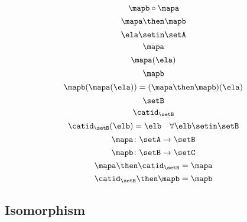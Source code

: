 \begin{forslides}
\begin{equation}
\mapb \circ \mapa
\end{equation}
\begin{equation}\label{eq:slides_session2_135}
\mapa \then \mapb
\end{equation}
\begin{equation}\label{eq:slides_session2_136}
\ela \setin\setA
\end{equation}
\begin{equation}\label{eq:slides_session2_137}
\mapa
\end{equation}
\begin{equation}\label{eq:slides_session2_138}
\mapa(\ela)
\end{equation}
\begin{equation}\label{eq:slides_session2_139}
\mapb
\end{equation}
\begin{equation}\label{eq:slides_session2_140}
\mapb(\mapa(\ela))=(\mapa \then \mapb)(\ela)
\end{equation}
\begin{equation}\label{eq:slides_session2_141}
\setB
\end{equation}
\begin{equation}\label{eq:slides_session2_142}
\catid_\setB
\end{equation}
\begin{equation}\label{eq:slides_session2_143}
\catid_\setB(\elb) = \elb \quad \forall  \elb \setin\setB
\end{equation}
\begin{equation}\label{eq:slides_session2_144}
\mapa \colon \setA \to \setB
\end{equation}
\begin{equation}\label{eq:slides_session2_145}
\mapb \colon \setB \to \setC
\end{equation}
\begin{equation}\label{eq:slides_session2_146}
\mapa \then \catid_\setB = \mapa
\end{equation}
\begin{equation}\label{eq:slides_session2_147}
\catid_\setB \then \mapb = \mapb
\end{equation}

\subsection{Isomorphism}


\end{forslides}
